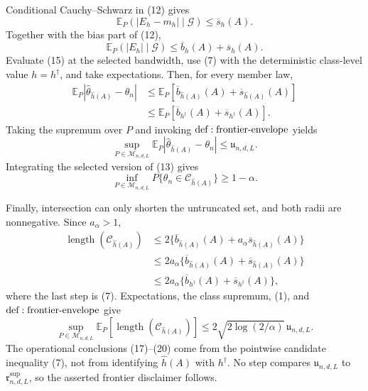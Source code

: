 Conditional Cauchy--Schwarz in (12) gives
\[
 \mathbb E_P(|E_h-m_h|\mid\mathcal G)\leq\overline s_h(A).
\]
Together with the bias part of (12),
\[
 \mathbb E_P(|E_h|\mid\mathcal G)
 \leq\overline b_h(A)+\overline s_h(A).
\tag{15}
\]
Evaluate (15) at the selected bandwidth, use (7) with the deterministic class-level value \(h=h^\dagger\), and take expectations.  Then, for every member law,
\[
\begin{aligned}
 \mathbb E_P|\widehat\theta_{\widehat h(A)}-\theta_n|
 &\leq\mathbb E_P[\overline b_{\widehat h(A)}(A)+\overline s_{\widehat h(A)}(A)]\\
 &\leq\mathbb E_P[\overline b_{h^\dagger}(A)+\overline s_{h^\dagger}(A)].
\end{aligned}
\tag{16}
\]
Taking the supremum over \(P\) and invoking \({\rm def:frontier\text{-}envelope}\) yields
\[
 \sup_{P\in\mathcal M_{n,d,L}}
 \mathbb E_P|\widehat\theta_{\widehat h(A)}-\theta_n|
 \leq\mathfrak u_{n,d,L}.
\tag{17}
\]
Integrating the selected version of (13) gives
\[
 \inf_{P\in\mathcal M_{n,d,L}}
 P\{\theta_n\in\mathcal C_{\widehat h(A)}\}\geq1-\alpha.
\tag{18}
\]

Finally, intersection can only shorten the untruncated set, and both radii are nonnegative.  Since \(a_\alpha>1\),
\[
\begin{aligned}
 \operatorname{length}(\mathcal C_{\widehat h(A)})
 &\leq2\{\overline b_{\widehat h(A)}(A)
      +a_\alpha\overline s_{\widehat h(A)}(A)\}\\
 &\leq2a_\alpha
 \{\overline b_{\widehat h(A)}(A)+\overline s_{\widehat h(A)}(A)\}\\
 &\leq2a_\alpha
 \{\overline b_{h^\dagger}(A)+\overline s_{h^\dagger}(A)\},
\end{aligned}
\tag{19}
\]
where the last step is (7).  Expectations, the class supremum, (1), and \({\rm def:frontier\text{-}envelope}\) give
\[
 \sup_{P\in\mathcal M_{n,d,L}}
 \mathbb E_P[\operatorname{length}(\mathcal C_{\widehat h(A)})]
 \leq2\sqrt{2\log(2/\alpha)}\,\mathfrak u_{n,d,L}.
\tag{20}
\]
The operational conclusions (17)--(20) come from the pointwise candidate inequality (7), not from identifying \(\widehat h(A)\) with \(h^\dagger\).  No step compares \(\mathfrak u_{n,d,L}\) to \(\mathfrak r^{\mathrm{sup}}_{n,d,L}\), so the asserted frontier disclaimer follows.